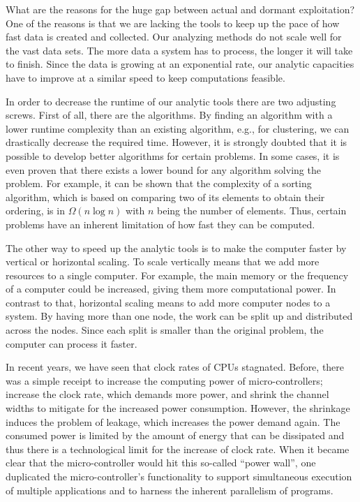 What are the reasons for the huge gap between actual and dormant exploitation?
One of the reasons is that we are lacking the tools to keep up the pace of how fast data is created and collected.
Our analyzing methods do not scale well for the vast data sets.
The more data a system has to process, the longer it will take to finish.
Since the data is growing at an exponential rate, our analytic capacities have to improve at a similar speed to keep computations feasible.

In order to decrease the runtime of our analytic tools there are two adjusting screws.
First of all, there are the algorithms.
By finding an algorithm with a lower runtime complexity than an existing algorithm, e.g., for clustering, we can drastically decrease the required time.
However, it is strongly doubted that it is possible to develop better algorithms for certain problems.
In some cases, it is even proven that there exists a lower bound for any algorithm solving the problem.
For example, it can be shown that the complexity of a sorting algorithm, which is based on comparing two of its elements to obtain their ordering, is in $\Omega\left(n\log n\right)$ with $n$ being the number of elements.
Thus, certain problems have an inherent limitation of how fast they can be computed.

The other way to speed up the analytic tools is to make the computer faster by vertical or horizontal scaling.
To scale vertically means that we add more resources to a single computer.
For example, the main memory or the frequency of a computer could be increased, giving them more computational power.
In contrast to that, horizontal scaling means to add more computer nodes to a system.
By having more than one node, the work can be split up and distributed across the nodes.
Since each split is smaller than the original problem, the computer can process it faster.

In recent years, we have seen that clock rates of CPUs stagnated.
Before, there was a simple receipt to increase the computing power of micro-controllers; increase the clock rate, which demands more power, and shrink the channel widths to mitigate for the increased power consumption.
However, the shrinkage induces the problem of leakage, which increases the power demand again.
The consumed power is limited by the amount of energy that can be dissipated and thus there is a technological limit for the increase of clock rate.
When it became clear that the micro-controller would hit this so-called ``power wall'', one duplicated the micro-controller's functionality to support simultaneous execution of multiple applications and to harness the inherent parallelism of programs.

